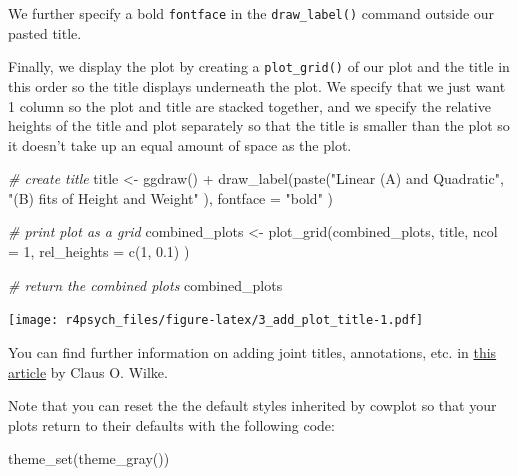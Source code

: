 \documentclass[
]{book}
\newenvironment{Shaded}{\begin{snugshade}}{\end{snugshade}}
\newcommand{\AttributeTok}[1]{\textcolor[rgb]{0.77,0.63,0.00}{#1}}
\newcommand{\CommentTok}[1]{\textcolor[rgb]{0.56,0.35,0.01}{\textit{#1}}}
\newcommand{\DecValTok}[1]{\textcolor[rgb]{0.00,0.00,0.81}{#1}}
\newcommand{\FloatTok}[1]{\textcolor[rgb]{0.00,0.00,0.81}{#1}}
\newcommand{\FunctionTok}[1]{\textcolor[rgb]{0.00,0.00,0.00}{#1}}
\newcommand{\NormalTok}[1]{#1}
\newcommand{\OtherTok}[1]{\textcolor[rgb]{0.56,0.35,0.01}{#1}}
\newcommand{\SpecialCharTok}[1]{\textcolor[rgb]{0.00,0.00,0.00}{#1}}
\newcommand{\StringTok}[1]{\textcolor[rgb]{0.31,0.60,0.02}{#1}}
\begin{document}
We further specify a bold \texttt{fontface} in the \texttt{draw\_label()} command outside our pasted title.

Finally, we display the plot by creating a \texttt{plot\_grid()} of our plot and the title in this order so the title displays underneath the plot. We specify that we just want 1 column so the plot and title are stacked together, and we specify the relative heights of the title and plot separately so that the title is smaller than the plot so it doesn't take up an equal amount of space as the plot.

\begin{Shaded}
\begin{Highlighting}[]
\CommentTok{\# create title}
\NormalTok{title }\OtherTok{\textless{}{-}} \FunctionTok{ggdraw}\NormalTok{() }\SpecialCharTok{+} 
  \FunctionTok{draw\_label}\NormalTok{(}\FunctionTok{paste}\NormalTok{(}\StringTok{"Linear (A) and Quadratic"}\NormalTok{,}
                   \StringTok{"(B) fits of Height and Weight"}
\NormalTok{                   ), }
             \AttributeTok{fontface =} \StringTok{"bold"}
\NormalTok{             )}

\CommentTok{\# print plot as a grid}
\NormalTok{combined\_plots }\OtherTok{\textless{}{-}} \FunctionTok{plot\_grid}\NormalTok{(combined\_plots, }
\NormalTok{                            title, }
                            \AttributeTok{ncol =} \DecValTok{1}\NormalTok{, }
                            \AttributeTok{rel\_heights =} \FunctionTok{c}\NormalTok{(}\DecValTok{1}\NormalTok{, }\FloatTok{0.1}\NormalTok{)}
\NormalTok{                            )}

\CommentTok{\# return the combined plots}
\NormalTok{combined\_plots}
\end{Highlighting}
\end{Shaded}

\texttt{[image: r4psych\_files/figure-latex/3\_add\_plot\_title-1.pdf]}

You can find further information on adding joint titles, annotations, etc. in \href{https://htmlpreview.github.io/?https://github.com/wilkelab/cowplot/blob/master/inst/doc/plot_annotations.html}{this article} by Claus O. Wilke.

Note that you can reset the the default styles inherited by cowplot so that your plots return to their defaults with the following code:

\begin{Shaded}
\begin{Highlighting}[]
\FunctionTok{theme\_set}\NormalTok{(}\FunctionTok{theme\_gray}\NormalTok{())}
\end{Highlighting}
\end{Shaded}
\end{document}
